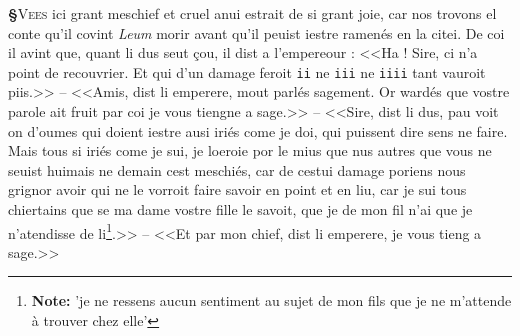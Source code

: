 \documentclass[12pt]{article} %
\newcommand{\colmar}[1]{\marginnote{[#1]}}          %
\newcommand{\persName}[1]{\emph{#1}} %
\newcommand{\num}[1]{\texttt{#1}}    %
\newcommand{\supplied}[1]{\textlangle#1\textrangle} %
\newcommand{\fnnote}[1]{\footnote{\textbf{Note:} #1}} %
\newcounter{paranum}
\newcommand{\pnum}{\stepcounter{paranum}\textbf{§\arabic{paranum}}\quad}
\begin{document}
\pnum \lettrine[lines=2]{\color{darkred}V}{ees} ici grant meschief et cruel anui estrait de si grant joie, car nos trovons el conte qu'il covint \persName{Leum} morir avant qu'il peuist iestre ramenés en la citei. De coi il \supplied{avint} que, quant li dus seut çou, il dist a l'empereour : <<Ha ! Sire, ci n'a point de recouvrier. Et qui d'un damage feroit \num{ii} ne \num{iii} ne \num{iiii} tant vauroit piis.>> -- <<Amis, dist li emperere, mout parlés sagement. \colmar{4vb}\colmar{b} Or wardés que vostre parole ait fruit par coi je vous tiengne a sage.>> -- <<Sire, dist li dus, pau voit on d'oumes qui doient iestre ausi iriés come je doi, qui puissent dire sens ne faire. Mais tous si iriés come je sui, je loeroie por le mius que nus autres que vous ne seuist huimais ne demain cest meschiés, car de cestui damage poriens nous grignor avoir qui ne le vorroit faire savoir en point et en liu, car je sui tous chiertains que se ma dame vostre fille le savoit, que je de mon fil n'ai que je n'atendisse de li\fnnote{'je ne ressens aucun sentiment au sujet de mon fils que je ne m'attende à trouver chez elle'}.>> -- <<Et par mon chief, dist li emperere, je vous tieng a sage.>>
\end{document}
